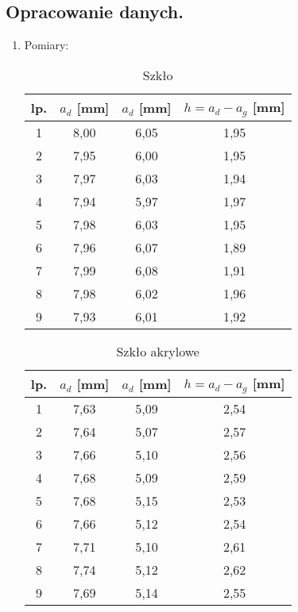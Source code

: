 \documentclass [a4paper,11pt]{article}
\begin{document}
	\subsection{Opracowanie danych.}\label{sec:drm}
	\begin{enumerate}[label=\alph*)]
		
		\item Pomiary:
		\begin{table}[!h]
			\caption{Szkło}
			\label{tab:szklo}
			\begin{center}
				\begin{tabular}{|c|c|c|c|}
					\hline lp. & $a_d$  [mm] & $a_d$ [mm] & $h = a_d - a_g$ [mm]  \\
					\hline 1 & 8,00 & 6,05 & 1,95 \\
					\hline 2 & 7,95 & 6,00 & 1,95 \\
					\hline 3 & 7,97 & 6,03 & 1,94 \\
					\hline 4 & 7,94 & 5,97 & 1,97 \\
					\hline 5 & 7,98 & 6,03 & 1,95 \\
					\hline 6 & 7,96 & 6,07 & 1,89 \\
					\hline 7 & 7,99 & 6,08 & 1,91 \\
					\hline 8 & 7,98 & 6,02 & 1,96 \\
					\hline 9 & 7,93 & 6,01 & 1,92 \\
					\hline 
				\end{tabular} 
			\end{center}
		\end{table}
		\begin{table}[!h]
			\caption{Szkło akrylowe}
			\label{tab:pleksi}
			\begin{center}
				\begin{tabular}{|c|c|c|c|}
					\hline lp. & $a_d$  [mm] & $a_d$ [mm] & $h = a_d - a_g$ [mm]  \\
					\hline 1 & 7,63 & 5,09 & 2,54 \\
					\hline 2 & 7,64 & 5,07 & 2,57 \\
					\hline 3 & 7,66 & 5,10 & 2,56 \\
					\hline 4 & 7,68 & 5,09 & 2,59 \\
					\hline 5 & 7,68 & 5,15 & 2,53 \\
					\hline 6 & 7,66 & 5,12 & 2,54 \\
					\hline 7 & 7,71 & 5,10 & 2,61 \\
					\hline 8 & 7,74 & 5,12 & 2,62 \\
					\hline 9 & 7,69 & 5,14 & 2,55 \\
					\hline 
				\end{tabular} 
			\end{center}
		\end{table}
		

\end{enumerate}
\end{document}
